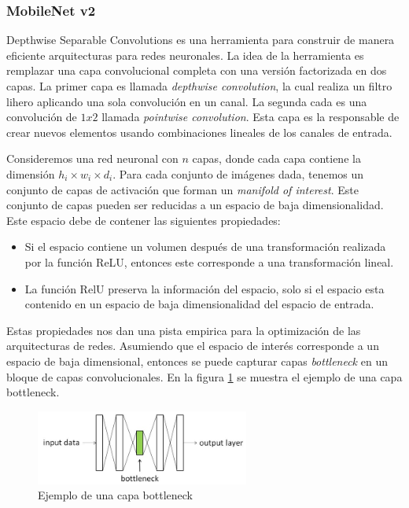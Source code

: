 \subsubsection{MobileNet v2}


Depthwise Separable Convolutions es una herramienta para construir de manera eficiente arquitecturas para redes neuronales\cite{Howard_2017,Chollet_2016,Zhang_2017}. La idea de la herramienta es remplazar una capa convolucional completa con una versión factorizada en dos capas. La primer capa es llamada \textit{depthwise convolution}, la cual realiza un filtro lihero aplicando una sola convolución en un canal. La segunda cada es una convolución de $1x2$ llamada \textit{pointwise convolution}. Esta capa es la responsable de crear nuevos elementos usando combinaciones lineales de los canales de entrada.



Consideremos una red neuronal con $n$ capas, donde cada capa contiene la dimensión $h_i \times w_i \times d_i$. Para cada conjunto de imágenes dada, tenemos un conjunto de capas de activación que forman un \textit{manifold of interest}. Este conjunto de capas pueden ser reducidas a un espacio de baja dimensionalidad. Este espacio debe de contener las siguientes propiedades:

\begin{itemize}
    \item Si el espacio contiene un volumen después de una transformación realizada por la función ReLU, entonces este corresponde a una transformación lineal.
    \item La función RelU preserva la información del espacio, solo si el espacio esta contenido en un espacio de baja dimensionalidad del espacio de entrada.
\end{itemize}

Estas propiedades nos dan una pista empirica para la optimización de las arquitecturas de redes. Asumiendo que el espacio de interés corresponde a un espacio de baja dimensional, entonces se puede capturar capas \textit{bottleneck} en un bloque de capas convolucionales. En la figura \ref{fig:bottleneck} se muestra el ejemplo de una capa bottleneck.

\begin{figure}[H]
    \centering
    \includegraphics[width=7cm]{Graphics/bottleneck.jpeg}
    \caption{Ejemplo de una capa bottleneck}
    \label{fig:bottleneck}
\end{figure}

